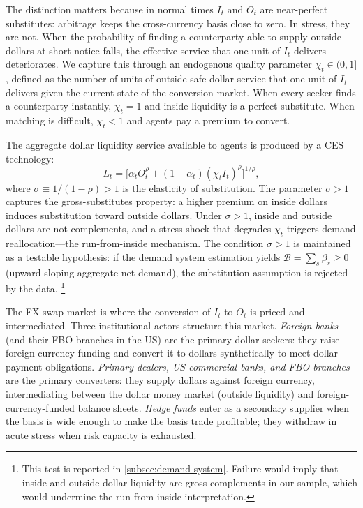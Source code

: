 The distinction matters because in normal times $I_t$ and $O_t$ are near-perfect
substitutes: arbitrage keeps the cross-currency basis close to zero. In stress,
they are not. When the probability of finding a counterparty able to supply
outside dollars at short notice falls, the effective service that one unit of
$I_t$ delivers deteriorates. We capture this through an endogenous quality
parameter $\chi_t \in (0,1]$, defined as the number of units of outside safe
dollar service that one unit of $I_t$ delivers given the current state of the
conversion market. When every seeker finds a counterparty instantly, $\chi_t = 1$
and inside liquidity is a perfect substitute. When matching is difficult,
$\chi_t < 1$ and agents pay a premium to convert.

The aggregate dollar liquidity service available to agents is produced by a CES
technology:
\begin{equation}
  L_t = \bigl[\alpha_t O_t^{\rho} + (1-\alpha_t)(\chi_t I_t)^{\rho}
  \bigr]^{1/\rho},
  \label{eq:CES}
\end{equation}
where $\sigma \equiv 1/(1-\rho) > 1$ is the elasticity of substitution.
The parameter $\sigma > 1$ captures the gross-substitutes property:
a higher premium on inside dollars induces substitution toward outside
dollars. Under $\sigma > 1$, inside and outside dollars are not complements,
and a stress shock that degrades $\chi_t$ triggers demand reallocation---the
run-from-inside mechanism. The condition $\sigma > 1$ is maintained as a
testable hypothesis: if the demand system estimation yields $\mathcal{B} =
\sum_s \beta_s \geq 0$ (upward-sloping aggregate net demand), the substitution
assumption is rejected by the data.%
\footnote{This test is reported in \cref{subsec:demand-system}. Failure would
imply that inside and outside dollar liquidity are gross complements in our
sample, which would undermine the run-from-inside interpretation.}

The FX swap market is where the conversion of $I_t$ to $O_t$ is priced and
intermediated. Three institutional actors structure this market. \emph{Foreign
banks} (and their FBO branches in the US) are the primary dollar seekers: they
raise foreign-currency funding and convert it to dollars synthetically to meet
dollar payment obligations. \emph{Primary dealers, US commercial banks, and FBO
branches} are the primary converters: they supply dollars against foreign
currency, intermediating between the dollar money market (outside liquidity) and
foreign-currency-funded balance sheets. \emph{Hedge funds} enter as a secondary
supplier when the basis is wide enough to make the basis trade profitable; they
withdraw in acute stress when risk capacity is exhausted.

